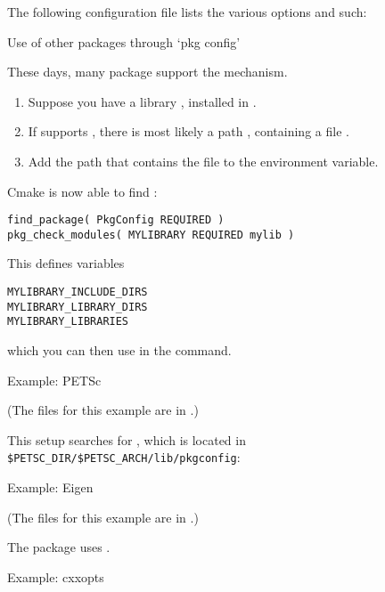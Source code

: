The following configuration file lists the various options and such:
%



 {Use of other packages through `pkg config'}

These days, many package support the  mechanism.
\begin{enumerate}
\item Suppose you have a library , installed in .
\item If  supports , there is most likely a path
  , containing a file .
\item Add the path that contains the  file to the
   environment variable.
\end{enumerate}
Cmake is now able to find :
\begin{lstlisting}
find_package( PkgConfig REQUIRED )
pkg_check_modules( MYLIBRARY REQUIRED mylib )
\end{lstlisting}

This defines variables
\begin{verbatim}
MYLIBRARY_INCLUDE_DIRS
MYLIBRARY_LIBRARY_DIRS
MYLIBRARY_LIBRARIES
\end{verbatim}
which you can then use in the 
command.

 {Example: PETSc}

(The files for this example are in .)

This  setup searches for ,
which is located in \verb+$PETSC_DIR/$PETSC_ARCH/lib/pkgconfig+:
%



 {Example: Eigen}

(The files for this example are in .)

The  package uses .




 {Example: cxxopts}

